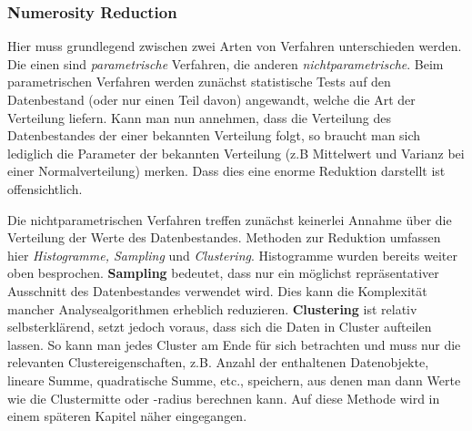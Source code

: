 \subsubsection{Numerosity Reduction}
Hier muss grundlegend zwischen zwei Arten von Verfahren unterschieden werden. Die
einen sind \textit{parametrische} Verfahren, die anderen \textit{nichtparametrische}.
Beim parametrischen Verfahren werden zunächst statistische Tests auf den Datenbestand
(oder nur einen Teil davon) angewandt, welche die Art der Verteilung liefern. Kann
man nun annehmen, dass die Verteilung des Datenbestandes der einer bekannten Verteilung
folgt, so braucht man sich lediglich die Parameter der bekannten Verteilung (z.B 
Mittelwert und Varianz bei einer Normalverteilung) merken. Dass dies eine enorme
Reduktion darstellt ist offensichtlich.

Die nichtparametrischen Verfahren treffen zunächst keinerlei Annahme über die
Verteilung der Werte des Datenbestandes. Methoden zur Reduktion umfassen hier
\textit{Histogramme, Sampling} und \textit{Clustering}. Histogramme wurden bereits
weiter oben besprochen. \textbf{Sampling} bedeutet, dass nur ein möglichst 
repräsentativer Ausschnitt des Datenbestandes verwendet wird. Dies kann die 
Komplexität mancher Analysealgorithmen erheblich reduzieren. \textbf{Clustering}
ist relativ selbsterklärend, setzt jedoch voraus, dass sich die Daten in Cluster
aufteilen lassen. So kann man jedes Cluster am Ende für sich betrachten und muss
nur die relevanten Clustereigenschaften, z.B. Anzahl der enthaltenen Datenobjekte,
lineare Summe, quadratische Summe, etc., speichern, aus denen man dann Werte wie die
Clustermitte oder -radius berechnen kann. Auf diese Methode wird in einem späteren
Kapitel näher eingegangen.

